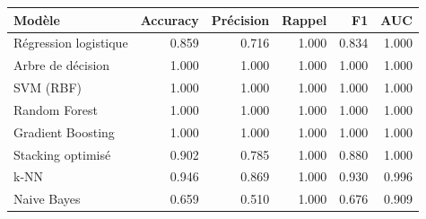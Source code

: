 \begin{tabular}{lrrrrr}
\toprule
Modèle & Accuracy & Précision & Rappel & F1 & AUC \\
\midrule
Régression logistique & 0.859 & 0.716 & 1.000 & 0.834 & 1.000 \\
Arbre de décision & 1.000 & 1.000 & 1.000 & 1.000 & 1.000 \\
SVM (RBF) & 1.000 & 1.000 & 1.000 & 1.000 & 1.000 \\
Random Forest & 1.000 & 1.000 & 1.000 & 1.000 & 1.000 \\
Gradient Boosting & 1.000 & 1.000 & 1.000 & 1.000 & 1.000 \\
Stacking optimisé & 0.902 & 0.785 & 1.000 & 0.880 & 1.000 \\
k-NN & 0.946 & 0.869 & 1.000 & 0.930 & 0.996 \\
Naive Bayes & 0.659 & 0.510 & 1.000 & 0.676 & 0.909 \\
\bottomrule
\end{tabular}